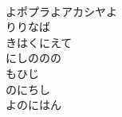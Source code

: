 \documentclass[10pt,b5j]{tarticle} %
\begin{document}
\begin{enumerate}
\begin{minipage}[c]{\blocksize}
    \end{minipage}
    \begin{minipage}[c]{\blocksize}
        
        \vspace{\linespace}
        \item~\\
        よポプラよアカシヤよ\\
        りりなば\\
        きはくにえて\\
        にしののの\\
        もひじ\\
        のにちし\\
        よのにはん
    
    \end{minipage}
\end{enumerate} %
\end{document}
